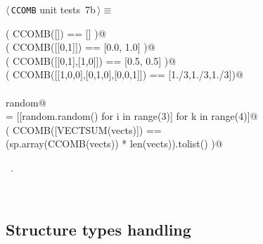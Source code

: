 \documentclass[11pt,oneside]{article}	%
\begin{document}
\begin{flushleft} \small
\begin{minipage}{\linewidth} \label{scrap22}
\protect{}$\langle\,$\texttt{CCOMB} unit tests\nobreak\ {\footnotesize 7b}$\,\rangle\equiv$
\vspace{-1ex}
\begin{list}{}{} \item
\mbox{}\verb@assert( CCOMB([]) == [] )@\\
\mbox{}\verb@assert( CCOMB([[0,1]]) == [0.0, 1.0] )@\\
\mbox{}\verb@assert( CCOMB([[0,1],[1,0]]) == [0.5, 0.5] )@\\
\mbox{}\verb@assert( CCOMB([[1,0,0],[0,1,0],[0,0,1]]) == [1./3,1./3,1./3])@\\
\mbox{}\verb@@\\
\mbox{}\verb@import random@\\
\mbox{}\verb@vects = [[random.random() for i in range(3)] for k in range(4)]@\\
\mbox{}\verb@assert( CCOMB([VECTSUM(vects)]) == \@\\
\mbox{}\verb@        (sp.array(CCOMB(vects)) * len(vects)).tolist() )@\\
\mbox{}\verb@@{\NWsep}
\end{list}
\vspace{-1ex}
\footnotesize\addtolength{\baselineskip}{-1ex}
\begin{list}{}{\setlength{\itemsep}{-\parsep}\setlength{\itemindent}{-\leftmargin}}
\item \NWtxtMacroRefIn\ .
\end{list}
\end{minipage}\\[4ex]
\end{flushleft}





\subsection{Structure types handling}
\end{document}

